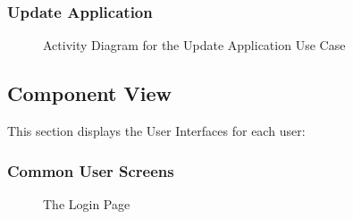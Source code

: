 \documentclass[11pt]{article}
\begin{document}
\subsubsection{Update Application}
\begin{figure}[H]
	\caption{Activity Diagram for the Update Application Use Case}
\end{figure}
\subsection{Component View}
This section displays the User Interfaces for each user:

\subsubsection{Common User Screens}
\begin{figure}[H]
	\caption{The Login Page}
\end{figure}
\end{document}
